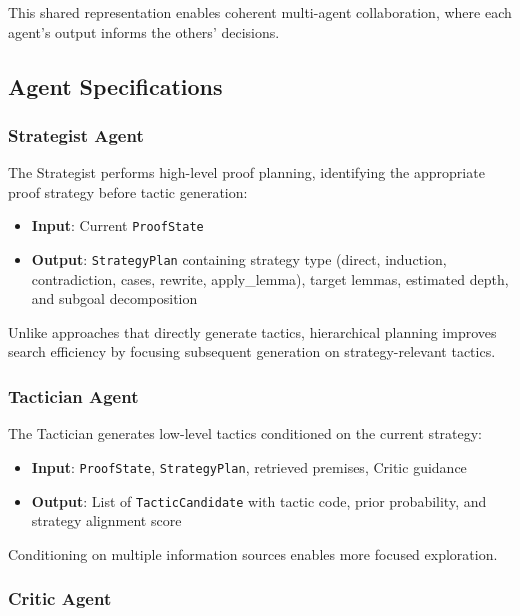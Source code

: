 \documentclass[11pt]{article}
\begin{document}
This shared representation enables coherent multi-agent collaboration, where each agent's output informs the others' decisions.

\subsection{Agent Specifications}

\subsubsection{Strategist Agent}

The Strategist performs high-level proof planning, identifying the appropriate proof strategy before tactic generation:

\begin{itemize}
    \item \textbf{Input}: Current \texttt{ProofState}
    \item \textbf{Output}: \texttt{StrategyPlan} containing strategy type (direct, induction, contradiction, cases, rewrite, apply\_lemma), target lemmas, estimated depth, and subgoal decomposition
\end{itemize}

Unlike approaches that directly generate tactics, hierarchical planning improves search efficiency by focusing subsequent generation on strategy-relevant tactics.

\subsubsection{Tactician Agent}

The Tactician generates low-level tactics conditioned on the current strategy:

\begin{itemize}
    \item \textbf{Input}: \texttt{ProofState}, \texttt{StrategyPlan}, retrieved premises, Critic guidance
    \item \textbf{Output}: List of \texttt{TacticCandidate} with tactic code, prior probability, and strategy alignment score
\end{itemize}

Conditioning on multiple information sources enables more focused exploration.

\subsubsection{Critic Agent}
\end{document}
